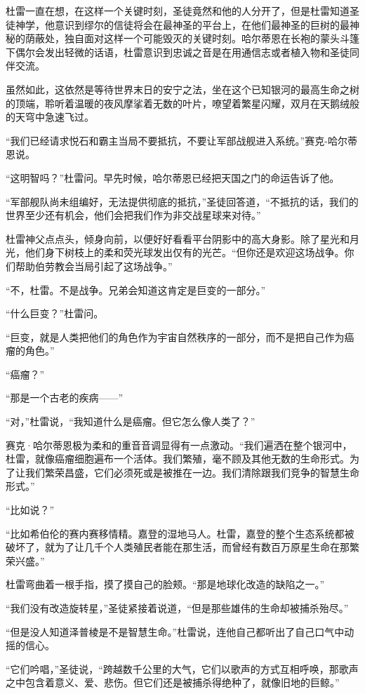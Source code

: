 \documentclass[AutoFakeBold=true]{book}
\begin{document}
杜雷一直在想，在这样一个关键时刻，圣徒竟然和他的人分开了，但是杜雷知道圣徒神学，他意识到缪尔的信徒将会在最神圣的平台上，在他们最神圣的巨树的最神秘的荫蔽处，独自面对这样一个可能毁灭的关键时刻。哈尔蒂恩在长袍的蒙头斗篷下偶尔会发出轻微的话语，杜雷意识到忠诚之音是在用通信志或者植入物和圣徒同伴交流。

虽然如此，这依然是等待世界末日的安宁之法，坐在这个已知银河的最高生命之树的顶端，聆听着温暖的夜风摩挲着无数的叶片，嘹望着繁星闪耀，双月在天鹅绒般的天穹中急速飞过。

``我们已经请求悦石和霸主当局不要抵抗，不要让军部战舰进入系统。''赛克-哈尔蒂恩说。

``这明智吗？''杜雷问。早先时候，哈尔蒂恩已经把天国之门的命运告诉了他。

``军部舰队尚未组编好，无法提供彻底的抵抗，''圣徒回答道，``不抵抗的话，我们的世界至少还有机会，他们会把我们作为非交战星球来对待。''

杜雷神父点点头，倾身向前，以便好好看看平台阴影中的高大身影。除了星光和月光，他们身下树枝上的柔和荧光球发出仅有的光芒。``但你还是欢迎这场战争。你们帮助伯劳教会当局引起了这场战争。''

``不，杜雷。不是战争。兄弟会知道这肯定是巨变的一部分。''

``什么巨变？''杜雷问。

``巨变，就是人类把他们的角色作为宇宙自然秩序的一部分，而不是把自己作为癌瘤的角色。''

``癌瘤？''

``那是一个古老的疾病——''

``对，''杜雷说，``我知道什么是癌瘤。但它怎么像人类了？''

赛克·哈尔蒂恩极为柔和的重音音调显得有一点激动。``我们遍洒在整个银河中，杜雷，就像癌瘤细胞遍布一个活体。我们繁殖，毫不顾及其他无数的生命形式。为了让我们繁荣昌盛，它们必须死或是被推在一边。我们清除跟我们竞争的智慧生命形式。''

``比如说？''

``比如希伯伦的赛内赛移情精。嘉登的湿地马人。杜雷，嘉登的整个生态系统都被破坏了，就为了让几千个人类殖民者能在那生活，而曾经有数百万原星生命在那繁荣兴盛。''

杜雷弯曲着一根手指，摸了摸自己的脸颊。``那是地球化改造的缺陷之一。''

``我们没有改造旋转星，''圣徒紧接着说道，``但是那些雄伟的生命却被捕杀殆尽。''

``但是没人知道泽普棱是不是智慧生命。''杜雷说，连他自己都听出了自己口气中动摇的信心。

``它们吟唱，''圣徒说，``跨越数千公里的大气，它们以歌声的方式互相呼唤，那歌声之中包含着意义、爱、悲伤。但它们还是被捕杀得绝种了，就像旧地的巨鲸。''
\end{document}
